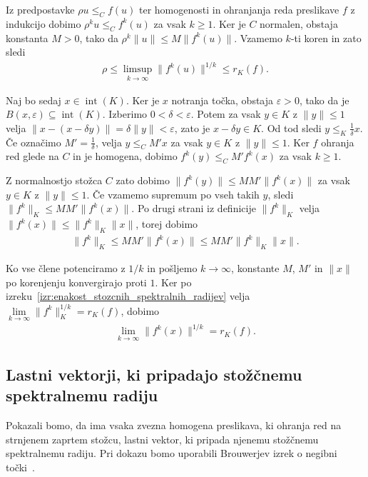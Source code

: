 \documentclass[mat2, tisk]{fmfdelo}
\begin{document}
\begin{dokaz}
  Iz predpostavke $\rho u\leq_C f(u)$ ter homogenosti in ohranjanja reda
  preslikave $f$ z indukcijo dobimo
  $\rho^k u\leq_C f^k(u)$ za vsak $k\geq1$.
  Ker je $C$ normalen, obstaja konstanta $M>0$, tako da
  $\rho^k\|u\|\leq M\|f^k(u)\|$. Vzamemo $k$-ti koren in zato sledi
  \begin{align*}
  \rho
  \leq
  \limsup_{k\to\infty}\|f^k(u)\|^{1/k}
  \leq
  r_K(f).
  \end{align*}

  Naj bo sedaj $x\in\operatorname{int}(K)$. Ker je $x$ notranja točka, obstaja $\varepsilon>0$, tako da je
  $B(x,\varepsilon)\subseteq\operatorname{int}(K)$. Izberimo $0<\delta<\varepsilon$. Potem za vsak
  $y\in K$ z $\|y\|\leq1$ velja $\|x-(x-\delta y)\|=\delta\|y\|<\varepsilon$,
  zato je $x-\delta y\in K$. Od tod sledi
  $y\leq_K\frac{1}{\delta}x$. Če označimo
  $M'=\frac{1}{\delta}$, velja
  $y\leq_C M'x$ za vsak $y\in K$ z $\|y\|\leq1$.
  Ker $f$ ohranja red glede na $C$ in je homogena,
  dobimo $f^k(y)\leq_C M'f^k(x)$ za vsak $k\geq1$.

  Z normalnostjo stožca $C$ zato dobimo
  $\|f^k(y)\|\leq MM'\|f^k(x)\|$ za vsak $y\in K$ z $\|y\|\leq1$.
  Če vzamemo supremum po vseh takih $y$, sledi
  $\|f^k\|_K\leq MM'\|f^k(x)\|$. Po drugi strani iz definicije
  $\|f^k\|_K$ velja
  $\|f^k(x)\|\leq\|f^k\|_K\|x\|$, torej dobimo
  \begin{align*}
  \|f^k\|_K
  \leq
  M M' \|f^k(x)\|
  \leq
  M M' \|f^k\|_K\|x\|.
  \end{align*}

  Ko vse člene potenciramo z $1/k$ in pošljemo $k\to\infty$, konstante
  $M$, $M'$ in $\|x\|$ po korenjenju konvergirajo proti $1$. Ker po
  izreku~\ref{izr:enakost_stozcnih_spektralnih_radijev} velja
  $\lim\limits_{k\to\infty}\|f^k\|_K^{1/k}=r_K(f)$, dobimo
  \begin{align*}
  \lim\limits_{k\to\infty}\|f^k(x)\|^{1/k}
  =
  r_K(f).
  \end{align*}
\end{dokaz}






\subsection{Lastni vektorji, ki pripadajo stožčnemu spektralnemu radiju}

Pokazali bomo, da ima vsaka zvezna homogena preslikava,
ki ohranja red na strnjenem zaprtem stožcu, lastni vektor,
ki pripada njenemu stožčnemu spektralnemu radiju.
Pri dokazu bomo uporabili Brouwerjev izrek o negibni
točki~\cite{Ciarlet2025}.
\end{document}
